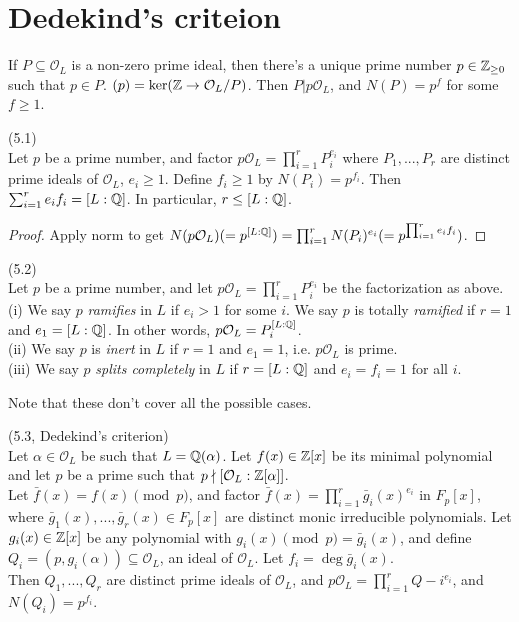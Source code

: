 \documentclass[a4paper]{article}
\begin{document}
\newpage
\section{Dedekind's criteion}
If $P\subseteq \mathcal{O}_L$ is a non-zero prime ideal, then there's a unique prime number $p \in \mathbb{Z}_{\geq 0}$ such that $p \in P$. $(p) = \ker(\mathbb{Z} \to \mathcal{O}_L/P)$. Then $P | p \mathcal{O}_L$, and $N(P) = p^f$ for some $f \geq 1$.

\begin{lemma} (5.1)\\
Let $p$ be a prime number, and factor $p\mathcal{O}_L = \prod_{i=1}^r P_i^{e_i}$ where $P_1,...,P_r$ are distinct prime ideals of $\mathcal{O}_L$, $e_i \geq 1$. Define $f_i \geq 1$ by $N(P_i) = p^{f_i}$. Then $\sum_{i=1}^r e_i f_i = [L:\mathbb{Q}]$. In particular, $r \leq [L:\mathbb{Q}]$.
\begin{proof}
Apply norm to get $N(p\mathcal{O}_L) (=p^{[L:\mathbb{Q}]}) = \prod_{i=1}^r N(P_i)^{e_i} (=p^{\prod_{i=1}^r e_if_i})$.
\end{proof}
\end{lemma}

\begin{defi} (5.2)\\
Let $p$ be a prime number, and let $p\mathcal{O}_L = \prod_{i=1}^r P_i^{e_i}$ be the factorization as above.\\
(i) We say $p$ \emph{ramifies} in $L$ if $e_i > 1$ for some $i$. We say $p$ is totally \emph{ramified} if $r=1$ and $e_1 = [L:\mathbb{Q}]$. In other words, $p\mathcal{O}_L = P_i^{[L:\mathbb{Q}]}$.\\
(ii) We say $p$ is \emph{inert} in $L$ if $r=1$ and $e_1 = 1$, i.e. $p\mathcal{O}_L$ is prime.\\
(iii) We say $p$ \emph{splits completely} in $L$ if $r=[L:\mathbb{Q}]$ and $e_i=f_i=1$ for all $i$.

Note that these don't cover all the possible cases.
\end{defi}

\begin{thm} (5.3, Dedekind's criterion)\\
Let $\alpha \in \mathcal{O}_L$ be such that $L=\mathbb{Q}(\alpha)$. Let $f(x) \in \mathbb{Z}[x]$ be its minimal polynomial and let $p$ be a prime such that $p \nmid [\mathcal{O}_L:\mathbb{Z}[\alpha]]$.\\
Let $\bar{f}(x) = f(x) \pmod p$, and factor $\bar{f}(x) = \prod_{i=1}^r \bar{g}_i(x)^{e_i}$ in $F_p[x]$, where $\bar{g}_1(x),...,\bar{g}_r(x) \in F_p[x]$ are distinct monic irreducible polynomials. Let $g_i(x) \in \mathbb{Z}[x]$ be any polynomial with $g_i(x) \pmod p = \bar{g}_i(x)$, and define $Q_i = (p,g_i(\alpha)) \subseteq \mathcal{O}_L$, an ideal of $\mathcal{O}_L$. Let $f_i = \deg \bar{g}_i(x)$.\\
Then $Q_1,...,Q_r$ are distinct prime ideals of $\mathcal{O}_L$, and $p\mathcal{O}_L = \prod_{i=1}^r Q-i^{e_i}$, and $N(Q_i) = p^{f_i}$.
\end{thm}
\end{document}
